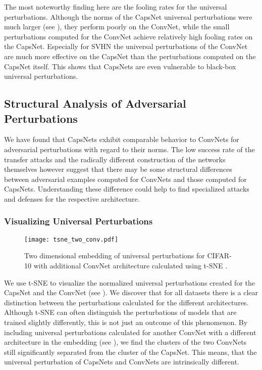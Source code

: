 The most noteworthy finding here are the fooling rates for the universal perturbations.
Although the norms of the CapsNet universal perturbations were much larger (see ), they perform poorly on the ConvNet, while the small perturbations computed for the ConvNet achieve relatively high fooling rates on the CapsNet.
Especially for SVHN the universal perturbations of the ConvNet are much more effective on the CapsNet than the perturbations computed on the CapsNet itself.
This shows that CapsNets are even vulnerable to black-box universal perturbations.

\subsection{Structural Analysis of Adversarial Perturbations}

We have found that CapsNets exhibit comparable behavior to ConvNets for adversarial perturbations with regard to their norms.
The low success rate of the transfer attacks and the radically different construction of the networks themselves however suggest that there may be some structural differences between adversarial examples computed for ConvNets and those computed for CapsNets.
Understanding these difference could help to find specialized attacks and defenses for the respective architecture.

\subsubsection{Visualizing Universal Perturbations}
\begin{wrapfigure}{R}{.5\textwidth}
	\centering
	\texttt{[image: tsne\_two\_conv.pdf]}
	\caption[t-SNE plot with additional ConvNet]{Two dimensional embedding of universal perturbations for CIFAR-10 with additional ConvNet architecture calculated using t-SNE \citep{tsne}.}
	\label{fig:tsnealt}
\end{wrapfigure}
We use t-SNE \citep{tsne} to visualize the normalized universal perturbations created for the CapsNet and the ConvNet (see ).
We discover that for all datasets there is a clear distinction between the perturbations calculated for the different architectures.
Although t-SNE can often distinguish the perturbations of models that are trained slightly differently, this is not just an outcome of this phenomenon.
By including universal perturbations calculated for another ConvNet with a different architecture in the embedding (see ), we find the clusters of the two ConvNets still significantly separated from the cluster of the CapsNet.
This means, that the universal perturbation of CapsNets and ConvNets are intrinsically different.




